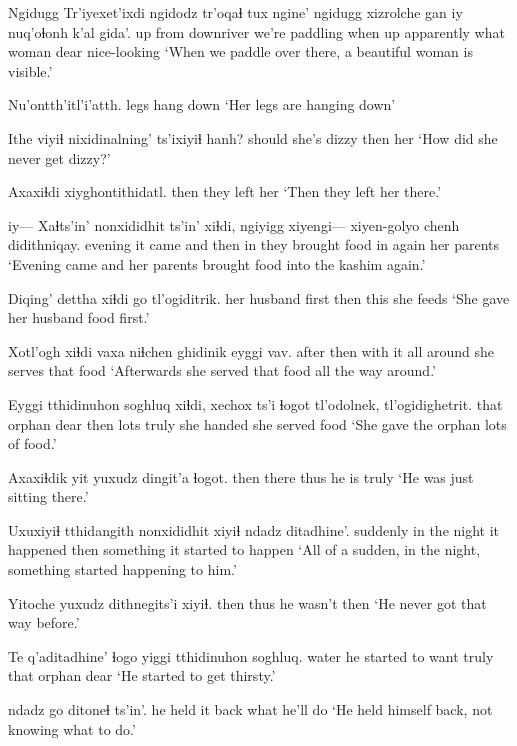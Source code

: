 \documentclass[12pt]{article}
\begin{document}
\gll Ngidugg Tr'iyexet'ixdi ngidodz tr'oqaɬ tux ngine' ngidugg xizrolche  {gan iy} nuq'oɬonh k'al      gida'.
up      {}           {from downriver}    {we're paddling} when up      apparently what   woman     dear nice-looking
\glt `When we paddle over there, a beautiful woman is visible.'
\glend

\gll Nu'ontth'itl'i'atth. 
{{legs hang down}}
\glt `Her legs are hanging down'
\glend

\gll Ithe {viyiɬ nixidinalning'} ts'ixiyiɬ hanh?
should  {she's dizzy} {then}               her
\glt `How did she never get dizzy?'
\glend

\gll Axaxiɬdi xiyghontithidatl.
then     {they left her}
\glt `Then they left her there.'
\glend

\gll iy--- Xaɬts'in' nonxididhit ts'in' xiɬdi, ngiyigg xiyengi--- xiyen-golyo chenh didithniqay.
{} evening   {it came}   and   then  in      {} {they brought food in} again {her parents}
\glt `Evening came and her parents brought food into the kashim again.'
\glend

\gll Diqing' dettha  xiɬdi  go tl'ogiditrik.
{her husband} first then this {she feeds}
\glt `She gave her husband food first.'
\glend

\gll Xotl'ogh xiɬdi vaxa niɬchen ghidinik eyggi vav.
after  then    {with it} {all around} {she serves} that food
\glt `Afterwards she served that food all the way around.'
\glend

\gll Eyggi tthidinuhon soghluq xiɬdi, {xechox ts'i} ɬogot tl'odolnek, tl'ogidighetrit.
that  orphan      dear    then  lots         truly {she handed} {she served food}
\glt `She gave the orphan lots of food.'
\glend

\gll Axaxiɬdik yit yuxudz dingit'a ɬogot.
then     there thus   {he is} truly
\glt `He was just sitting there.'
\glend

\gll Uxuxiyiɬ tthidangith  nonxididhit xiyiɬ ndadz     ditadhine'.
suddenly {in the night} {it happened} then  something {it started to happen}
\glt `All of a sudden, in the night, something started happening to him.'
\glend

\gll Yitoche yuxudz {dithnegits'i} xiyiɬ.
then     thus    {he wasn't} then
\glt `He never got that way before.'
\glend

\gll Te    q'aditadhine'      ɬogo yiggi tthidinuhon soghluq.
water {he started to want} truly that orphan dear 
\glt `He started to get thirsty.'
\glend

 {ndadz go} ditoneɬ ts'in'.
{he held it back}  what     {he'll do}
\glt `He held himself back, not knowing what to do.'
\glend
\end{document}
